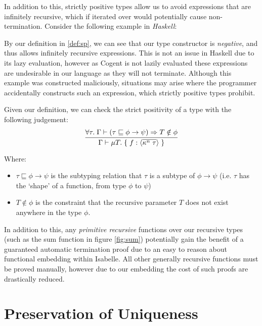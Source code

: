 In addition to this, strictly positive types allow us to avoid expressions that are infinitely recursive,
which if iterated over would potentially cause non-termination. Consider
the following example in \textit{Haskell}:



By our definition in \ref{def:sp}, we can see that our type constructor is \textit{negative}, and
thus allows infinitely recursive expressions. This is not an issue in Haskell due to its lazy evaluation,
however as Cogent is not lazily evaluated these expressions are undesirable in
our language as they will not terminate.
Although this example was constructed maliciously, situations may arise where the
programmer accidentally constructs such an expression, which strictly positive types prohibit.

Given our definition, we can check the strict positivity of a type with the following judgement:
$$
\infer{
    \Gamma \vdash \mu T.\; \{\; f: \langle \overline{\kappa^n\; \tau} \rangle\; \}
}{
   \forall \tau.\; \Gamma \vdash (\tau \sqsubseteq \phi \rightarrow \psi) \implies T \notin \phi
}
$$

Where:
\begin{itemize}
    \item 
        $\tau \sqsubseteq \phi \rightarrow \psi$ is the subtyping relation that $\tau$ 
        is a subtype of $\phi \rightarrow \psi$ 
        (i.e. $\tau$ has the `shape' of a function, from type $\phi$ to $\psi$) 
    \item
        $T \notin \phi$ is the constraint that the recursive parameter $T$ 
        does not exist anywhere in the type $\phi$.
\end{itemize}

In addition to this, any \textit{primitive recursive} functions over our recursive types 
(such as the sum function in figure \ref{fig:sum}) potentially gain the benefit of a guaranteed
automatic termination proof due to an easy to reason about functional embedding within Isabelle.
All other generally recursive functions must be proved manually, however due to our embedding
the cost of such proofs are drastically reduced.

\section{Preservation of Uniqueness}


